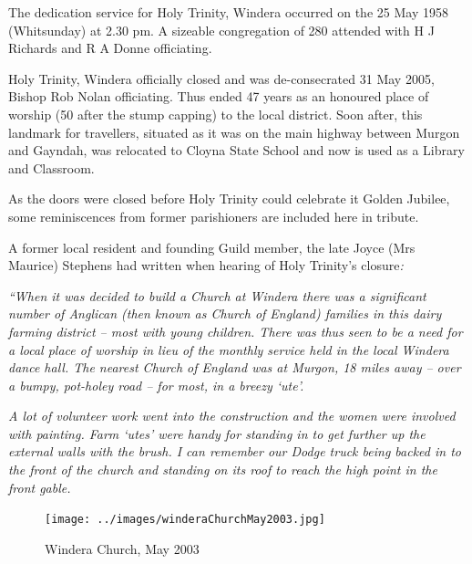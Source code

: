 The dedication service for Holy Trinity, Windera occurred on the 25 May 1958 (Whitsunday) at 2.30 pm. A sizeable congregation of 280 attended with H J Richards and R A Donne officiating.



Holy Trinity, Windera officially closed and was de-consecrated 31 May 2005, Bishop Rob Nolan officiating. Thus ended 47 years as an honoured place of worship (50 after the stump capping) to the local district. Soon after, this landmark for travellers, situated as it was on the main highway between Murgon and Gayndah, was relocated to Cloyna State School and now is used as a Library and Classroom.



As the doors were closed before Holy Trinity could celebrate it Golden Jubilee, some reminiscences from former parishioners are included here in tribute.



A former local resident and founding Guild member, the late Joyce (Mrs Maurice) Stephens had written when hearing of Holy Trinity's closure\emph{:}



\emph{``When it was decided to build a Church at Windera there was a significant number of Anglican (then known as Church of England) families in this dairy farming district -- most with young children. There was thus seen to be a need for a local place of worship in lieu of the monthly service held in the local Windera dance hall. The nearest Church of England was at Murgon, 18 miles away -- over a bumpy, pot-holey road -- for most, in a breezy `ute'.}



\emph{A lot of volunteer work went into the construction and the women were involved with painting. Farm `utes' were handy for standing in to get further up the external walls with the brush. I can remember our Dodge truck being backed in to the front of the church and standing on its roof to reach the high point in the front gable.}









\begin{figure}[!htb]
\begin{center}
\texttt{[image: ../images/winderaChurchMay2003.jpg]}
\caption{Windera Church, May 2003}
\end{center}
\end{figure}




